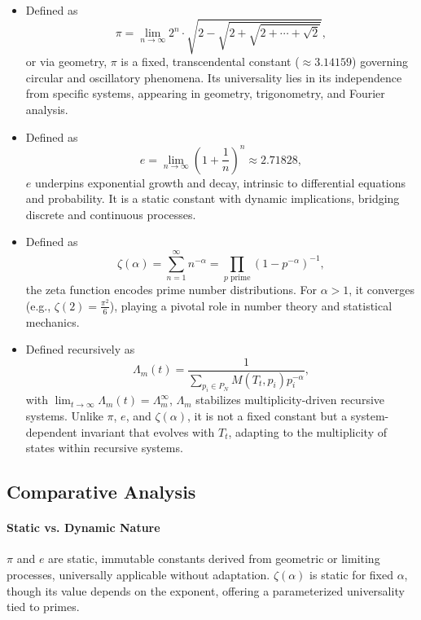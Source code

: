 \documentclass{article}
\theoremstyle{plain}
\begin{document}
\begin{itemize}
    \item[\textbf{\(\pi\)}] Defined as 
    \[
    \pi = \lim_{n \to \infty} 2^n \cdot \sqrt{2 - \sqrt{2 + \sqrt{2 + \cdots + \sqrt{2}}}},
    \]
    or via geometry, \(\pi\) is a fixed, transcendental constant (\(\approx 3.14159\)) governing circular and oscillatory phenomena. Its universality lies in its independence from specific systems, appearing in geometry, trigonometry, and Fourier analysis.

    \item[\textbf{\(e\)}] Defined as 
    \[
    e = \lim_{n \to \infty} \left(1 + \frac{1}{n}\right)^n \approx 2.71828,
    \]
    \(e\) underpins exponential growth and decay, intrinsic to differential equations and probability. It is a static constant with dynamic implications, bridging discrete and continuous processes.

    \item[\textbf{\(\zeta(\alpha)\)}] Defined as 
    \[
    \zeta(\alpha) = \sum_{n=1}^\infty n^{-\alpha} = \prod_{p \text{ prime}} (1 - p^{-\alpha})^{-1},
    \]
    the zeta function encodes prime number distributions. For \(\alpha > 1\), it converges (e.g., \(\zeta(2) = \frac{\pi^2}{6}\)), playing a pivotal role in number theory and statistical mechanics.

    \item[\textbf{\(\Lambda_m\)}] Defined recursively as 
    \[
    \Lambda_m(t) = \frac{1}{\sum_{p_i \in P_N} M(T_t, p_i) p_i^{-\alpha}},
    \]
    with \(\lim_{t \to \infty} \Lambda_m(t) = \Lambda_m^\infty\), \(\Lambda_m\) stabilizes multiplicity-driven recursive systems. Unlike \(\pi\), \(e\), and \(\zeta(\alpha)\), it is not a fixed constant but a system-dependent invariant that evolves with \(T_t\), adapting to the multiplicity of states within recursive systems.
\end{itemize}

\subsection{Comparative Analysis}

\paragraph{Static vs. Dynamic Nature}
\(\pi\) and \(e\) are static, immutable constants derived from geometric or limiting processes, universally applicable without adaptation. \(\zeta(\alpha)\) is static for fixed \(\alpha\), though its value depends on the exponent, offering a parameterized universality tied to primes. 
\end{document}
